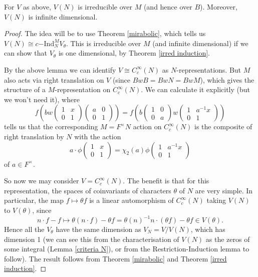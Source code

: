 \begin{prop}
    For $V$ as above, $V(N)$ is irreducible over $M$ (and hence over $B$). Moreover, $V(N)$ is infinite dimensional.
\end{prop}
\begin{proof}
    The idea will be to use Theorem \ref{mirabolic}, which tells us $V(N) \cong c\mathrm{-Ind}_N^M V_\theta$. This is irreducible over $M$ (and infinite dimensional) if we can show that $V_\theta$ is one dimensional, by Theorem \ref{irred induction}.

    By the above lemma we can identify $V \cong C_c^\infty(N)$ as $N$-representations. But $M$ also acts via right translation on $V$ (since $BwB=BwN=BwM$), which gives the structure of a $M$-representation on $C_c^\infty(N)$. We can calculate it explicitly (but we won't need it), where
    $$f\left(bw\begin{pmatrix}
        1&x\\0&1
    \end{pmatrix}\begin{pmatrix}
        a&0\\0&1
    \end{pmatrix}\right) = f\left(b \begin{pmatrix}
        1&0\\0&a
    \end{pmatrix}w\begin{pmatrix}
        1&a^{-1}x\\0&1
    \end{pmatrix}\right)$$
    tells us that the corresponding $M=F^\times N$ action on $C_c^\infty(N)$ is the composite of right translation by $N$ with the action 
    $$a\cdot \phi \begin{pmatrix}
        1&x\\0&1
    \end{pmatrix} = \chi_2(a) \phi \begin{pmatrix}
        1&a^{-1}x \\ 0&1
    \end{pmatrix}$$ of $a \in F^\times$.

    So now we may consider $V=C_c^\infty(N)$. The benefit is that for this representation, the spaces of coinvariants of characters $\theta$ of $N$ are very simple. In particular, the map $f \mapsto \theta f$ is a linear automorphism of $C_c^\infty(N)$ taking $V(N)$ to $V(\theta)$, since $$n \cdot f - f \mapsto \theta (n \cdot f) - \theta f = \theta(n)^{-1} n \cdot (\theta f) - \theta f \in V(\theta).$$
    Hence all the $V_\theta$ have the same dimension as $V_N=V/V(N)$, which has dimension 1 (we can see this from the characterisation of $V(N)$ as the zeros of some integral (Lemma \ref{criteria N}), or from the Restriction-Induction lemma to follow). The result follows from Theorem \ref{mirabolic} and Theorem \ref{irred induction}.
\end{proof}

